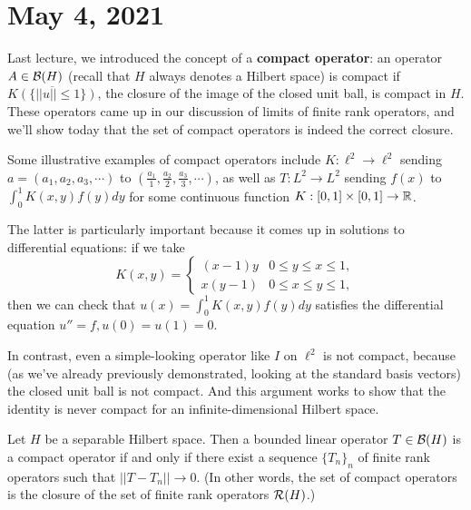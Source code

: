 \pagebreak\section*{May 4, 2021}

Last lecture, we introduced the concept of a \textbf{compact operator}: an operator $A \in \mathcal{B}(H)$ (recall that $H$ always denotes a Hilbert space) is compact if $\overline{K(\{||u|| \le 1\})}$, the closure of the image of the closed unit ball, is compact in $H$. These operators came up in our discussion of limits of finite rank operators, and we'll show today that the set of compact operators is indeed the correct closure. 

\begin{example}
Some illustrative examples of compact operators include $K: \ell^2 \to \ell^2$ sending $a = (a_1, a_2, a_3, \cdots)$ to $(\frac{a_1}{1}, \frac{a_2}{2}, \frac{a_3}{3}, \cdots)$, as well as $T: L^2 \to L^2$ sending $f(x)$ to $\int_0^1 K(x, y) f(y) dy$ for some continuous function $K: [0, 1] \times [0, 1] \to \mathbb R$.
\end{example}

The latter is particularly important because it comes up in solutions to differential equations: if we take 
\[
    K(x, y) = \begin{cases} (x-1) y & 0 \le y \le x \le 1, \\ x(y-1) & 0 \le x \le y \le 1, \end{cases} 
\] 
then we can check that $u(x) = \int_0^1 K(x, y) f(y) dy$ satisfies the differential equation $u'' = f, u(0) = u(1) = 0$. 

\begin{example}
In contrast, even a simple-looking operator like $I$ on $\ell^2$ is not compact, because (as we've already previously demonstrated, looking at the standard basis vectors) the closed unit ball is not compact. And this argument works to show that the identity is never compact for an infinite-dimensional Hilbert space.
\end{example}

\begin{theorem}
Let $H$ be a separable Hilbert space. Then a bounded linear operator $T \in \mathcal{B}(H)$ is a compact operator if and only if there exist a sequence $\{T_n\}_n$ of finite rank operators such that $||T - T_n|| \to 0$. (In other words, the set of compact operators is the closure of the set of finite rank operators $\mathcal{R}(H)$.)
\end{theorem}

